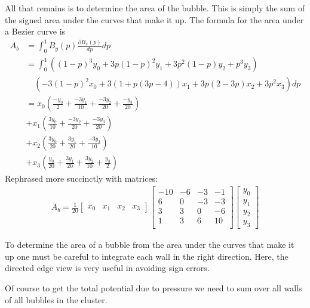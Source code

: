 \documentclass{article}
\begin{document}
All that remains is to determine the area of the bubble. This is simply the sum
of the signed area under the curves that make it up. The formula for the area
under a Bezier curve is
\begin{align*}
A_b &= \int_0^1 B_y(p)\frac{\partial B_x(p)}{dp} dp\\
&=\int_0^1
\left((1-p)^3y_0+3p(1-p)^2y_1+3p^2(1-p)y_2+p^3y_3\right)\\
&\quad \left(-3(1-p)^2x_0 +3(1+p(3p-4))x_1+3p(2-3p)x_2 +3p^2x_3\right)dp\\
&= x_0\left( \frac{-y_0}{2}+ \frac{-3y_1}{10}+\frac{-3y_2}{20}+\frac{-y_3}{20}\right)\\
&+ x_1\left(\frac{3y_0}{10}+ \frac{-3y_2}{20} +\frac{-3y_3}{20}\right)\\
&+ x_2\left(\frac{3y_0}{20}+ \frac{3y_1}{20} +\frac{-3y_3}{10}\right)\\
&+ x_3\left(\frac{y_0}{20} + \frac{3y_1}{20} +\frac{3y_2}{10}
+\frac{y_3}{2}\right)
\end{align*}
Rephrased more succinctly with matrices:
\begin{align}
A_b=
\frac{1}{20} 
\begin{bmatrix} x_0 & x_1 & x_2 & x_3 \end{bmatrix}
\begin{bmatrix} 
-10 & -6 & -3 & -1\\
6 & 0 & -3 & -3\\
3 & 3 & 0 & -6\\
1 & 3 & 6 & 10\\ 
\end{bmatrix}
\left[ \begin{array}{c} y_0\\y_1\\y_2\\y_3 \end{array} \right] 
\end{align}

To determine the area of a bubble from the area under the curves that make it up
one must be careful to integrate each wall in the right direction. Here, the
directed edge view is very useful in avoiding sign errors.

Of course to get the total potential due to pressure we need to sum over all
walls of all bubbles in the cluster.
\end{document}
